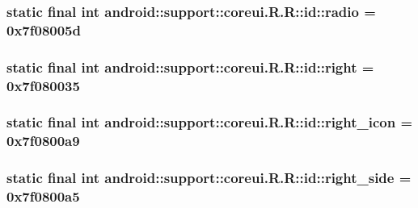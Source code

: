 \hypertarget{classandroid_1_1support_1_1coreui_1_1_r_1_1id_c0670096880e71554a2e54e66221f7c0}{
\subsubsection[{radio}]{\setlength{\rightskip}{0pt plus 5cm}static final int android::support::coreui.R.R::id::radio = 0x7f08005d}}
\label{classandroid_1_1support_1_1coreui_1_1_r_1_1id_c0670096880e71554a2e54e66221f7c0}


\hypertarget{classandroid_1_1support_1_1coreui_1_1_r_1_1id_ee634df8c4be46e634fa15f4f82f2019}{
\subsubsection[{right}]{\setlength{\rightskip}{0pt plus 5cm}static final int android::support::coreui.R.R::id::right = 0x7f080035}}
\label{classandroid_1_1support_1_1coreui_1_1_r_1_1id_ee634df8c4be46e634fa15f4f82f2019}


\hypertarget{classandroid_1_1support_1_1coreui_1_1_r_1_1id_18e1929aa261ee9bc33fc61ffdfcf252}{
\subsubsection[{right\_\-icon}]{\setlength{\rightskip}{0pt plus 5cm}static final int android::support::coreui.R.R::id::right\_\-icon = 0x7f0800a9}}
\label{classandroid_1_1support_1_1coreui_1_1_r_1_1id_18e1929aa261ee9bc33fc61ffdfcf252}


\hypertarget{classandroid_1_1support_1_1coreui_1_1_r_1_1id_89a0068fd9451cf5fbec08d059da65d8}{
\subsubsection[{right\_\-side}]{\setlength{\rightskip}{0pt plus 5cm}static final int android::support::coreui.R.R::id::right\_\-side = 0x7f0800a5}}
\label{classandroid_1_1support_1_1coreui_1_1_r_1_1id_89a0068fd9451cf5fbec08d059da65d8}


